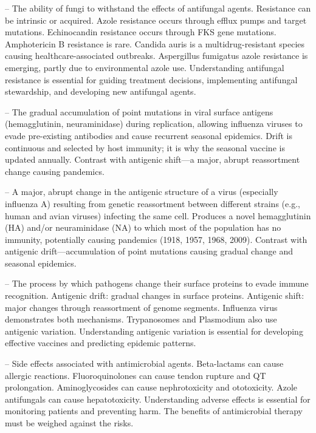 -- The ability of fungi to withstand the effects of antifungal agents. Resistance can be intrinsic or acquired. Azole resistance occurs through efflux pumps and target mutations. Echinocandin resistance occurs through FKS gene mutations. Amphotericin B resistance is rare. Candida auris is a multidrug-resistant species causing healthcare-associated outbreaks. Aspergillus fumigatus azole resistance is emerging, partly due to environmental azole use. Understanding antifungal resistance is essential for guiding treatment decisions, implementing antifungal stewardship, and developing new antifungal agents.

-- The gradual accumulation of point mutations in viral surface antigens (hemagglutinin, neuraminidase) during replication, allowing influenza viruses to evade pre-existing antibodies and cause recurrent seasonal epidemics. Drift is continuous and selected by host immunity; it is why the seasonal vaccine is updated annually. Contrast with antigenic shift—a major, abrupt reassortment change causing pandemics.

-- A major, abrupt change in the antigenic structure of a virus (especially influenza A) resulting from genetic reassortment between different strains (e.g., human and avian viruses) infecting the same cell. Produces a novel hemagglutinin (HA) and/or neuraminidase (NA) to which most of the population has no immunity, potentially causing pandemics (1918, 1957, 1968, 2009). Contrast with antigenic drift—accumulation of point mutations causing gradual change and seasonal epidemics.

-- The process by which pathogens change their surface proteins to evade immune recognition. Antigenic drift: gradual changes in surface proteins. Antigenic shift: major changes through reassortment of genome segments. Influenza virus demonstrates both mechanisms. Trypanosomes and Plasmodium also use antigenic variation. Understanding antigenic variation is essential for developing effective vaccines and predicting epidemic patterns.

-- Side effects associated with antimicrobial agents. Beta-lactams can cause allergic reactions. Fluoroquinolones can cause tendon rupture and QT prolongation. Aminoglycosides can cause nephrotoxicity and ototoxicity. Azole antifungals can cause hepatotoxicity. Understanding adverse effects is essential for monitoring patients and preventing harm. The benefits of antimicrobial therapy must be weighed against the risks.

